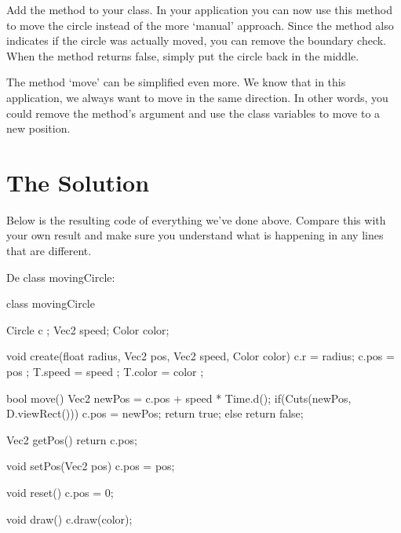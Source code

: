 \begin{exercise}
Add the method  to your class. In your application you can now use this method to move the circle instead of the more `manual' approach. Since the method also indicates if the circle was actually moved, you can remove the boundary check. When the method returns false, simply put the circle back in the middle.

The method `move' can be simplified even more. We know that in this application, we always want to move in the same direction. In other words, you could remove the method's argument and use the class variables to move to a new position.
\end{exercise}

\section{The Solution}
Below is the resulting code of everything we've done above. Compare this with your own result and make sure you understand what is happening in any lines that are different.

De class movingCircle:
\begin{code}
class movingCircle
{
   Circle c    ;
   Vec2   speed;
   Color  color;
   
   void create(float radius, Vec2 pos, Vec2 speed, Color color)
   {
      c.r     = radius;
      c.pos   = pos   ;
      T.speed = speed ;
      T.color = color ;
   }
   
   bool move()
   {
      Vec2 newPos = c.pos + speed * Time.d();
      if(Cuts(newPos, D.viewRect()))
      {
         c.pos = newPos;
         return true;
      } else return false;
   }
   
   Vec2 getPos()
   {
      return c.pos;
   }
   
   void setPos(Vec2 pos)
   {
      c.pos = pos;
   }
   
   void reset()
   {
      c.pos = 0;
   }
   
   void draw()
   {
      c.draw(color);
   }
}
\end{code}

